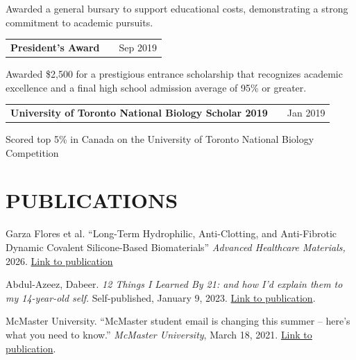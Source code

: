 \documentclass[a4paper,10pt]{article}
\begin{document}
Awarded a general bursary to support educational costs, demonstrating a strong commitment to academic pursuits.
\vspace{6pt}


\begin{tabularx}{\linewidth}{@{}l X r@{}}
\textbf{President’s Award} & \hfill &     Sep 2019
 \end{tabularx}

Awarded \$2,500 for a prestigious entrance scholarship that recognizes academic excellence and a final high school admission average of 95\% or greater.


\vspace{6pt}


\begin{tabularx}{\linewidth}{@{}l X r@{}}
\textbf{University of Toronto National Biology Scholar 2019 } & \hfill &     Jan 2019
 \end{tabularx}

Scored top 5\% in Canada on the University of Toronto National Biology Competition


\section{PUBLICATIONS}

Garza Flores et al. “Long-Term Hydrophilic, Anti-Clotting, and Anti-Fibrotic Dynamic Covalent Silicone-Based Biomaterials” \textit{Advanced Healthcare Materials, }2026. \href{https://advanced.onlinelibrary.wiley.com/doi/10.1002/adhm.71278}{Link to publication}
\vspace{8pt}


Abdul-Azeez, Dabeer. \textit{12 Things I Learned By 21: and how I'd explain them to my 14-year-old self}. Self-published, January 9, 2023. \href{https://a.co/d/1IZYYJJ}{Link to publication}.
\vspace{8pt}


McMaster University. “McMaster student email is changing this summer – here’s what you need to know.” \textit{McMaster University}, March 18, 2021. \href{https://dailynews.mcmaster.ca/worthmentioning/mcmaster-student-email-is-changing-this-summer-heres-what-you-need-to-know/}{Link to publication}.
\vspace{8pt}
\end{document}
